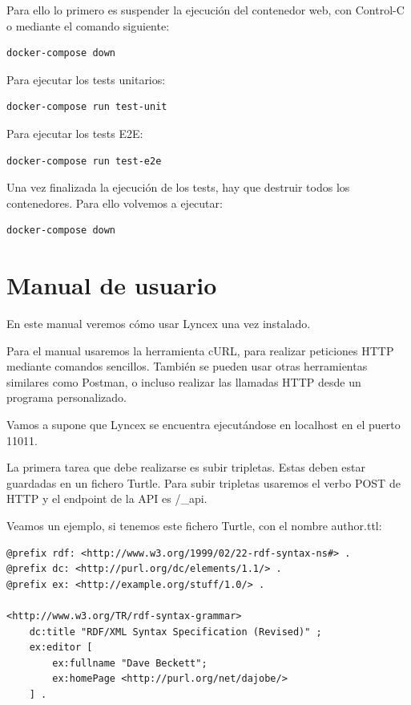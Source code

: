 \documentclass[openright,twoside,12pt]{book}
\begin{document}
Para ello lo primero es suspender la ejecución del contenedor web, con Control-C o mediante el comando siguiente:
\begin{verbatim}
docker-compose down
\end{verbatim}

Para ejecutar los tests unitarios:
\begin{verbatim}
docker-compose run test-unit
\end{verbatim}

Para ejecutar los tests E2E:
\begin{verbatim}
docker-compose run test-e2e
\end{verbatim}

Una vez finalizada la ejecución de los tests, hay que destruir todos los contenedores. Para ello volvemos a ejecutar:
\begin{verbatim}
docker-compose down
\end{verbatim}

\section{Manual de usuario}

En este manual veremos cómo usar Lyncex una vez instalado. 

Para el manual usaremos la herramienta cURL, para realizar peticiones HTTP mediante comandos sencillos. También se pueden usar otras herramientas similares como Postman, o incluso realizar las llamadas HTTP desde un programa personalizado.

Vamos a supone que Lyncex se encuentra ejecutándose en localhost en el puerto 11011.

La primera tarea que debe realizarse es subir tripletas. Estas deben estar guardadas en un fichero Turtle. Para subir tripletas usaremos el verbo POST de HTTP y el endpoint de la API es /\_api.

Veamos un ejemplo, si tenemos este fichero Turtle, con el nombre author.ttl:

\begin{lstlisting}
@prefix rdf: <http://www.w3.org/1999/02/22-rdf-syntax-ns#> .
@prefix dc: <http://purl.org/dc/elements/1.1/> .
@prefix ex: <http://example.org/stuff/1.0/> .

<http://www.w3.org/TR/rdf-syntax-grammar>
    dc:title "RDF/XML Syntax Specification (Revised)" ;
    ex:editor [
        ex:fullname "Dave Beckett";
        ex:homePage <http://purl.org/net/dajobe/>
    ] .
\end{lstlisting}
\end{document}

